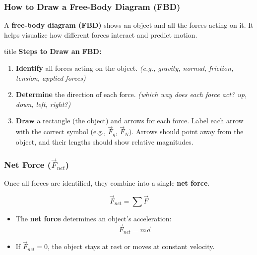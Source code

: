 \documentclass{beamer}
\begin{document}
\begin{frame}
\frametitle{How to Draw a Free-Body Diagram (FBD)}

A \textbf{free-body diagram (FBD)} shows an object and all the forces acting on it.  
It helps visualize how different forces interact and predict motion.

\vspace{0.4cm}

\begin{beamercolorbox}[rounded=true, shadow=true, wd=\textwidth, sep=1em]{title}
\textbf{Steps to Draw an FBD:}
\begin{enumerate}
    \item \textbf{Identify} all forces acting on the object.  
    \textit{(e.g., gravity, normal, friction, tension, applied forces)}
    \vspace{0.3cm}
    \item \textbf{Determine} the direction of each force.  
    \textit{(which way does each force act? up, down, left, right?)}
    \vspace{0.3cm}
    \item \textbf{Draw} a rectangle (the object) and arrows for each force.  
    Label each arrow with the correct symbol (e.g., $\vec{F}_g$, $\vec{F}_N$).  
    Arrows should point away from the object, and their lengths should show relative magnitudes.
\end{enumerate}
\end{beamercolorbox}

\end{frame}


\begin{frame}
\frametitle{Net Force ($\vec{F}_{net}$)}
Once all forces are identified, they combine into a single \textbf{net force}.  

\[
\vec{F}_{net} = \sum \vec{F}
\]

\begin{itemize}
\item The \textbf{net force} determines an object’s acceleration:
  \[
  \vec{F}_{net} = m\vec{a}
  \]
\item If $\vec{F}_{net} = 0$, the object stays at rest or moves at constant velocity.
\end{itemize}
\end{frame}

\end{document}
